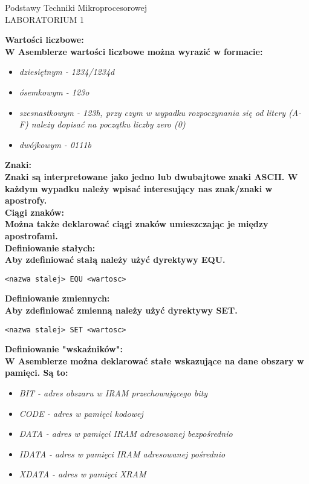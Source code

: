 \documentclass[a4paper,12pt]{article}
\newcommand{\h}[1]{\noindent \bf #1 \rm \\ \noindent}
\newcommand{\italic}[1]{\it #1 \rm}
\begin{document}
\begin{center}
	\LARGE
	Podstawy Techniki Mikroprocesorowej \\
	\large
	LABORATORIUM 1 
\end{center}
\vspace{1cm}	

\h{Wartości liczbowe:}
W Asemblerze wartości liczbowe można wyrazić w formacie:
\begin{itemize}
	\item \italic{dziesiętnym} - 1234/1234d
	\item \italic{ósemkowym} - 123o
	\item \italic{szesnastkowym} - 123h, przy czym w wypadku rozpoczynania się od litery (A-F) należy dopisać na początku liczby zero (0)
	\item \italic{dwójkowym} - 0111b
\end{itemize}
\vspace{5mm}

\h{Znaki:}
Znaki są interpretowane jako jedno lub dwubajtowe znaki ASCII. W każdym wypadku należy wpisać interesujący nas znak/znaki w apostrofy.\\

\h{Ciągi znaków:}
Można także deklarować ciągi znaków umieszczając je między apostrofami.\\

\h{Definiowanie stałych:}
Aby zdefiniować stałą należy użyć dyrektywy EQU.
\begin{lstlisting}[language={[x86masm]Assembler}]
<nazwa stalej> EQU <wartosc>
\end{lstlisting}
\vspace{5mm}

\h{Definiowanie zmiennych:}
Aby zdefiniować zmienną należy użyć dyrektywy SET.
\begin{lstlisting}[language={[x86masm]Assembler}]
<nazwa stalej> SET <wartosc>
\end{lstlisting}
\vspace{5mm}

\h{Definiowanie "wskaźników":}
W Asemblerze można deklarować stałe wskazujące na dane obszary w pamięci. Są to:
\begin{itemize}
	\item \italic{BIT} - adres obszaru w IRAM przechowującego bity
	\item \italic{CODE} - adres w pamięci kodowej
	\item \italic{DATA} - adres w pamięci IRAM adresowanej bezpośrednio
	\item \italic{IDATA} - adres w pamięci IRAM adresowanej pośrednio
	\item \italic{XDATA} - adres w pamięci XRAM
\end{itemize}
\vspace{5mm}
\end{document}
